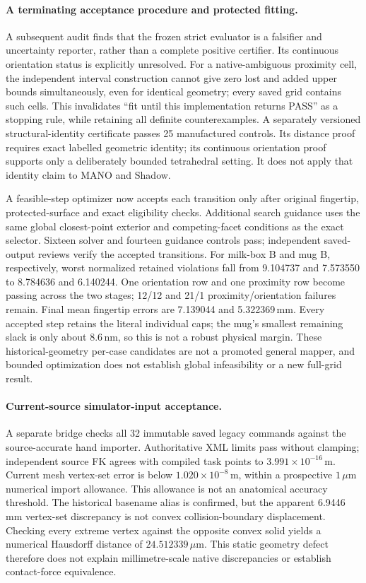 \documentclass[10pt,letterpaper]{article}
\begin{document}
\paragraph{A terminating acceptance procedure and protected fitting.}
A subsequent audit finds that the frozen strict evaluator is a falsifier and
uncertainty reporter, rather than a complete positive certifier. Its continuous
orientation status is explicitly unresolved. For a native-ambiguous proximity
cell, the independent interval construction cannot give zero lost and added
upper bounds simultaneously, even for identical geometry; every saved grid
contains such cells. This invalidates ``fit until this implementation returns
PASS'' as a stopping rule, while retaining all definite counterexamples.
A separately versioned structural-identity certificate passes 25 manufactured
controls. Its distance proof requires exact labelled geometric identity; its
continuous orientation proof supports only a deliberately bounded tetrahedral
setting. It does not apply that identity claim to MANO and Shadow.

A feasible-step optimizer now accepts each transition only after original
fingertip, protected-surface and exact eligibility checks. Additional search
guidance uses the same global closest-point exterior and competing-facet
conditions as the exact selector. Sixteen solver and fourteen guidance controls
pass; independent saved-output reviews verify the accepted transitions.
For milk-box B and mug B, respectively, worst normalized retained violations
fall from 9.104737 and 7.573550 to 8.784636 and 6.140244. One orientation row
and one proximity row become passing across the two stages; 12/12 and 21/1
proximity/orientation failures remain. Final mean fingertip errors are
7.139044 and 5.322369\,mm. Every accepted step retains the literal individual
caps; the mug's smallest remaining slack is only about 8.6\,nm, so this is not
a robust physical margin. These historical-geometry per-case candidates are
not a promoted general mapper, and bounded optimization does not establish
global infeasibility or a new full-grid result.

\paragraph{Current-source simulator-input acceptance.}
A separate bridge checks all 32 immutable saved legacy commands against the
source-accurate hand importer. Authoritative XML limits pass without clamping;
independent source FK agrees with compiled task points to
$3.991\times10^{-16}$\,m. Current mesh vertex-set error is below
$1.020\times10^{-8}$\,m, within a prospective $1\,\mu$m numerical import
allowance. This allowance is not an anatomical accuracy threshold.
The historical basename alias is confirmed, but the apparent 6.9446\,mm
vertex-set discrepancy is not convex collision-boundary displacement.
Checking every extreme vertex against the opposite convex solid yields a
numerical Hausdorff distance of $24.512339\,\mu$m. This static geometry defect
therefore does not explain millimetre-scale native discrepancies or establish
contact-force equivalence.
\end{document}
